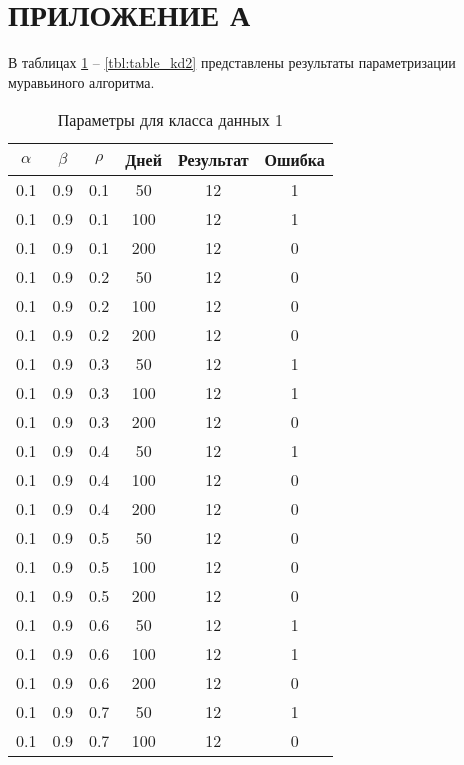 \chapter*{ПРИЛОЖЕНИЕ А}
В таблицах \ref{tbl:table_kd1} -- \ref{tbl:table_kd2} представлены результаты параметризации муравьиного алгоритма.

\begin{table}[h]
	\begin{center}
        \captionsetup{justification=raggedright,singlelinecheck=off}
		\caption{Параметры для класса данных 1\label{tbl:table_kd1}}
		\begin{tabular}{|c|c|c|c|c|c|}
	\hline
	$\alpha$ & $\beta$ & $\rho$ & Дней & Результат & Ошибка 
	\\ \hline
	0.1 &  0.9 &  0.1 &   50 &    12 &     1 \\
	0.1 &  0.9 &  0.1 &  100 &    12 &     1 \\
	0.1 &  0.9 &  0.1 &  200 &    12 &     0 \\
   \hline
	0.1 &  0.9 &  0.2 &   50 &    12 &     0 \\
	0.1 &  0.9 &  0.2 &  100 &    12 &     0 \\
	0.1 &  0.9 &  0.2 &  200 &    12 &     0 \\
   \hline
	0.1 &  0.9 &  0.3 &   50 &    12 &     1 \\
	0.1 &  0.9 &  0.3 &  100 &    12 &     1 \\
	0.1 &  0.9 &  0.3 &  200 &    12 &     0 \\
   \hline
	0.1 &  0.9 &  0.4 &   50 &    12 &     1 \\
	0.1 &  0.9 &  0.4 &  100 &    12 &     0 \\
	0.1 &  0.9 &  0.4 &  200 &    12 &     0 \\
   \hline
	0.1 &  0.9 &  0.5 &   50 &    12 &     0 \\
	0.1 &  0.9 &  0.5 &  100 &    12 &     0 \\
	0.1 &  0.9 &  0.5 &  200 &    12 &     0 \\
   \hline
	0.1 &  0.9 &  0.6 &   50 &    12 &     1 \\
	0.1 &  0.9 &  0.6 &  100 &    12 &     1 \\
	0.1 &  0.9 &  0.6 &  200 &    12 &     0 \\
   \hline
	0.1 &  0.9 &  0.7 &   50 &    12 &     1 \\
	0.1 &  0.9 &  0.7 &  100 &    12 &     0 \\

\end{tabular}
\end{center}
\end{table}
